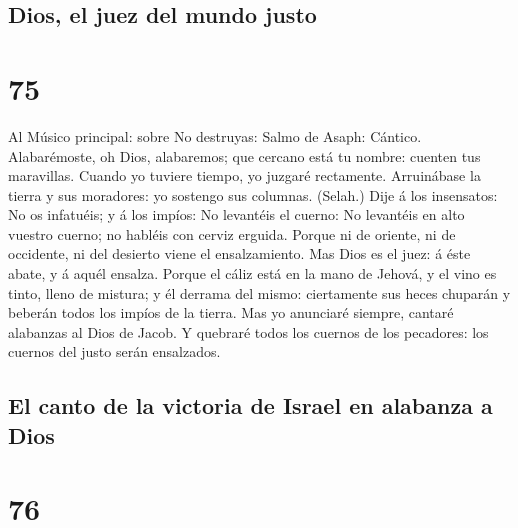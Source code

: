 \hypertarget{dios-el-juez-del-mundo-justo}{%
\subsection{Dios, el juez del mundo
justo}\label{dios-el-juez-del-mundo-justo}}

\hypertarget{section-74}{%
\section{75}\label{section-74}}

 Al Músico principal: sobre No destruyas: Salmo de Asaph:
Cántico. Alabarémoste, oh Dios, alabaremos; que cercano está tu nombre:
cuenten tus maravillas.  Cuando yo tuviere tiempo, yo
juzgaré rectamente.  Arruinábase la tierra y sus
moradores: yo sostengo sus columnas. (Selah.)  Dije á los
insensatos: No os infatuéis; y á los impíos: No levantéis el cuerno:
 No levantéis en alto vuestro cuerno; no habléis con
cerviz erguida.  Porque ni de oriente, ni de occidente, ni
del desierto viene el ensalzamiento.  Mas Dios es el juez:
á éste abate, y á aquél ensalza.  Porque el cáliz está en
la mano de Jehová, y el vino es tinto, lleno de mistura; y él derrama
del mismo: ciertamente sus heces chuparán y beberán todos los impíos de
la tierra.  Mas yo anunciaré siempre, cantaré alabanzas al
Dios de Jacob.  Y quebraré todos los cuernos de los
pecadores: los cuernos del justo serán ensalzados.

\hypertarget{el-canto-de-la-victoria-de-israel-en-alabanza-a-dios}{%
\subsection{El canto de la victoria de Israel en alabanza a
Dios}\label{el-canto-de-la-victoria-de-israel-en-alabanza-a-dios}}

\hypertarget{section-75}{%
\section{76}\label{section-75}}

